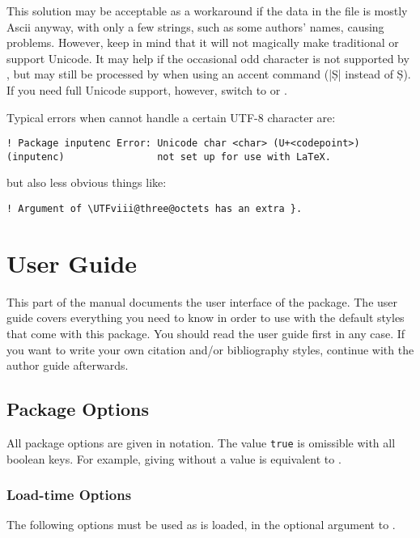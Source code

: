 \documentclass{ltxdockit}[2011/03/25]
\newcommand*{\biblatex}{\sty{biblatex}\xspace}
\begin{document}
This solution may be acceptable as a workaround if the data in the  file is mostly Ascii anyway, with only a few strings, such as some authors' names, causing problems. However, keep in mind that it will not magically make traditional \tex or \pdftex support Unicode. It may help if the occasional odd character is not supported by , but may still be processed by \tex when using an accent command (\eg |\d{S}| instead of \d{S}). If you need full Unicode support, however, switch to \xetex or \luatex.

Typical errors when  cannot handle a certain UTF-8 character are:

\begin{verbatim}
! Package inputenc Error: Unicode char <char> (U+<codepoint>)
(inputenc)                not set up for use with LaTeX.
\end{verbatim}
%
but also less obvious things like:

\begin{verbatim}
! Argument of \UTFviii@three@octets has an extra }.
\end{verbatim}

\section{User Guide}
\label{use}

This part of the manual documents the user interface of the \biblatex package. The user guide covers everything you need to know in order to use \biblatex with the default styles that come with this package. You should read the user guide first in any case. If you want to write your own citation and\slash or bibliography styles, continue with the author guide afterwards.

\subsection{Package Options}
\label{use:opt}

All package options are given in \keyval notation. The value \texttt{true} is omissible with all boolean keys. For example, giving  without a value is equivalent to .

\subsubsection{Load-time Options}
\label{use:opt:ldt}

The following options must be used as \biblatex is loaded, \ie in the optional argument to .
\end{document}
